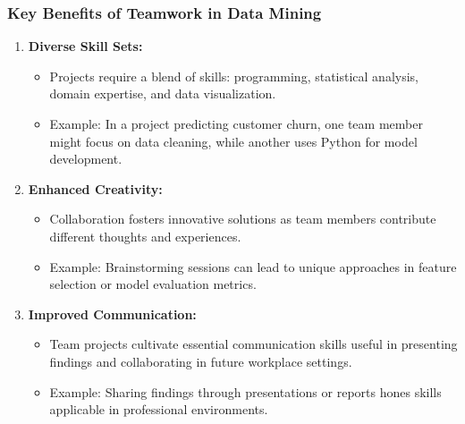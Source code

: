 \documentclass[aspectratio=169]{beamer}
\begin{document}
\begin{frame}[fragile]
    \frametitle{Key Benefits of Teamwork in Data Mining}
    \begin{enumerate}
        \item \textbf{Diverse Skill Sets:}
            \begin{itemize}
                \item Projects require a blend of skills: programming, statistical analysis, domain expertise, and data visualization.
                \item Example: In a project predicting customer churn, one team member might focus on data cleaning, while another uses Python for model development.
            \end{itemize}
        
        \item \textbf{Enhanced Creativity:}
            \begin{itemize}
                \item Collaboration fosters innovative solutions as team members contribute different thoughts and experiences.
                \item Example: Brainstorming sessions can lead to unique approaches in feature selection or model evaluation metrics.
            \end{itemize}

        \item \textbf{Improved Communication:}
            \begin{itemize}
                \item Team projects cultivate essential communication skills useful in presenting findings and collaborating in future workplace settings.
                \item Example: Sharing findings through presentations or reports hones skills applicable in professional environments.
            \end{itemize}
    \end{enumerate}
\end{frame}
\end{document}
